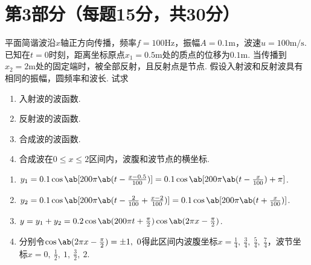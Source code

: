 \section*{第3部分（每题15分，共30分）}
\begin{problem}[驻波]
    平面简谐波沿$x$轴正方向传播，频率$f=100\mathrm{Hz}$，振幅$A=0.1\mathrm{m}$，波速$u=100\mathrm{m/s}$.已知在$t=0$时刻，距离坐标原点$x_1=0.5\mathrm{m}$处的质点的位移为$0.1\mathrm{m}$. 当传播到$x_2=2\mathrm{m}$处的固定端时，被全部反射，且反射点是节点. 假设入射波和反射波具有相同的振幅，圆频率和波长. 试求
\begin{enumerate}
    \item 入射波的波函数.
    \item 反射波的波函数.
    \item 合成波的波函数.
    \item 合成波在$0\leq x\leq 2$区间内，波腹和波节点的横坐标.
\end{enumerate}
\end{problem}
\begin{solution}
\begin{enumerate}
    \item $y_1=0.1\cos\ab[200\pi\ab(t-\frac{x-0.5}{100})]=0.1\cos\ab[200\pi\ab(t-\frac{x}{100})+\pi]$.
    \item $y_2=0.1\cos\ab[200\pi\ab(t-\frac{2}{100}+\frac{x-2}{100})]=0.1\cos\ab[200\pi\ab(t+\frac{x}{100})]$.
    \item $y=y_1+y_2=0.2\cos\ab(200\pi t+\frac\pi2)\cos\ab(2\pi x-\frac\pi2)$.
    \item 分别令$\cos\ab(2\pi x-\frac\pi2)=\pm1,\ 0$得此区间内波腹坐标$x=\frac14,\ \frac34,\ \frac54,\ \frac74$，波节坐标$x=0,\ \frac12,\ 1,\ \frac32,\ 2$.
\end{enumerate}
\end{solution}

